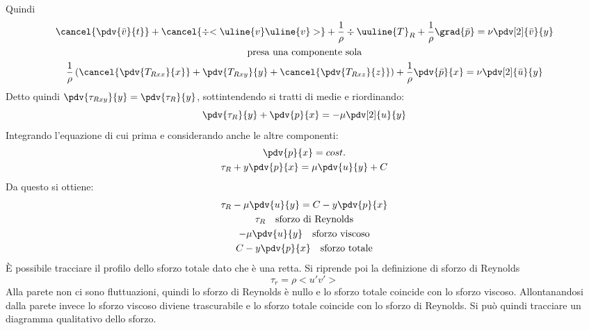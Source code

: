 Quindi
%
	\begin{equation*}
		\begin{gathered}
			\cancel{\pdv{\bar{v}}{t}} + \cancel{\div{<\uline{v} \uline{v}>}} + \frac{1}{\rho} \div{\uuline{T}_R} + \frac{1}{\rho} \grad{\bar{p}} = \nu \pdv[2]{\bar{v}}{y}\\
			\text{presa una componente sola}\\
			\frac{1}{\rho} \left( \cancel{\pdv{T_{Rxx}}{x}} + \pdv{T_{Rxy}}{y}+ \cancel{\pdv{T_{Rxz}}{z}} \right) + \frac{1}{\rho} \pdv{\bar{p}}{x} = \nu \pdv[2]{\bar{u}}{y}
		\end{gathered}
	\end{equation*}
%
Detto quindi $\pdv{\tau_{Rxy}}{y} = \pdv{\tau_R}{y}$, sottintendendo si tratti di medie e riordinando:
%
	\begin{equation*}
			\pdv{\tau_R}{y} + \pdv{p}{x} = - \mu \pdv[2]{u}{y}
	\end{equation*}
%
Integrando l'equazione di cui prima e considerando anche le altre componenti:
%
	\begin{equation*}
		\begin{gathered}
			\pdv{p}{x} = cost.\\
			\tau_R + y \pdv{p}{x} = \mu \pdv{u}{y} + C
		\end{gathered}
	\end{equation*}
%
Da questo si ottiene:
%
	\begin{equation*}
		\begin{gathered}
			\tau_R - \mu \pdv{u}{y} = C - y \pdv{p}{x}\\
			\tau_R \quad \text{sforzo di Reynolds}\\
			- \mu \pdv{u}{y} \quad \text{sforzo viscoso}\\
			C - y \pdv{p}{x} \quad \text{sforzo totale}
		\end{gathered}
	\end{equation*}
%
È possibile tracciare il profilo dello sforzo totale dato che è una retta.
Si riprende poi la definizione di sforzo di Reynolds
%
	\begin{equation*}
		\tau_r = \rho<u' v'>
	\end{equation*}
%
Alla parete non ci sono fluttuazioni, quindi lo sforzo di Reynolds è nullo e lo sforzo totale coincide con lo sforzo viscoso.
Allontanandosi dalla parete invece lo sforzo viscoso diviene trascurabile e lo sforzo totale coincide con lo sforzo di Reynolds.
Si può quindi tracciare un diagramma qualitativo dello sforzo.
